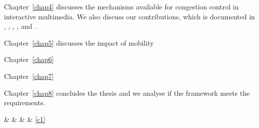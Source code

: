 Chapter~\ref{chap4} discusses the mechanisms available for congestion control
in interactive multimedia. We also discuss our contributions, which is
documented in , , ,
, and \cite{draft.rtp.cb}.


Chapter~\ref{chap5} discusses the impact of mobility 

Chapter~\ref{chap6}

Chapter~\ref{chap7}

Chapter~\ref{chap8} concludes the thesis and we analyse if the framework meets
the requirements.





 \&  \&   \& \pageref{c1} \& \ref{c1} 




